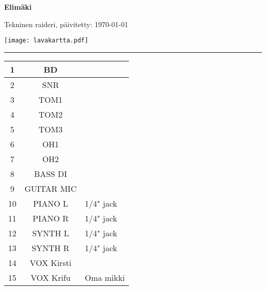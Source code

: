\documentclass[12pt]{article}
\begin{document}
\thispagestyle{empty}
\noindent\begin{minipage}{\textwidth}
{\Large\bfseries Elimäki}

Tekninen raideri, päivitetty: \today

\vspace{1.5cm}

\texttt{[image: lavakartta.pdf]}

\hrule
\end{minipage}
\vspace{1.5cm}
\begin{multicols}{2}
\begin{center}
\begin{tabular}{ c | c | p{2cm} }
1 & BD & \\ \hline
2 & SNR & \\ \hline
3 & TOM1 & \\ \hline
4 & TOM2 & \\ \hline
5 & TOM3 & \\ \hline 
6 & OH1 & \\ \hline
7 & OH2 & \\ \hline
8 & BASS DI & \\ \hline
9 & GUITAR MIC & \\ \hline
10 & PIANO L & 1/4" jack\\ \hline
11 & PIANO R & 1/4" jack\\ \hline
12 & SYNTH L & 1/4" jack\\ \hline
13 & SYNTH R & 1/4" jack\\ \hline
14 & VOX Kirsti & \\ \hline
15 & VOX Krifu & Oma mikki \\ 
\end{tabular}
\end{center}
\columnbreak




\vspace{0.5cm}
\end{multicols}
\end{document}

